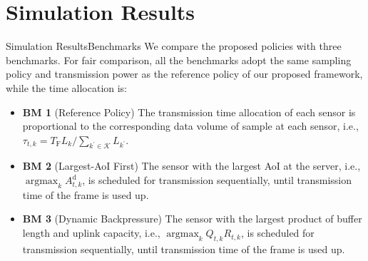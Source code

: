 \documentclass[aspectratio=169]{beamer}
\begin{document}
\section{Simulation Results}
\begin{frame}{Simulation Results}{Benchmarks}
    We compare the proposed policies with three benchmarks. For fair comparison, all the benchmarks adopt the same sampling policy and transmission power as the reference policy of our proposed framework, while the time allocation is:
    \begin{itemize}
        \item \textbf{BM 1} (Reference Policy) The transmission time allocation of each sensor is proportional to the corresponding data volume of sample at each sensor, i.e., $
		\tau_{t,k}\!=\!T_{\mathrm{F}}L_{k}/\sum_{k^{\prime}\!\in\!\mathcal{K}}L_{k^{\prime}}
	$.
        \item \textbf{BM 2} (Largest-AoI First) The sensor with the largest AoI at the server, i.e., $\mathop{\arg\max}_{k}A_{t,k}^{\mathrm{d}}$, is scheduled for transmission sequentially, until transmission time of the frame is used up.
        \item \textbf{BM 3} (Dynamic Backpressure) The sensor with the largest product of buffer length and uplink capacity, i.e., $\mathop{\arg\max}_{k}Q_{t,k}R_{t,k}$,  is scheduled for transmission sequentially, until transmission time of the frame is used up.
    \end{itemize}
\end{frame}
\end{document}
